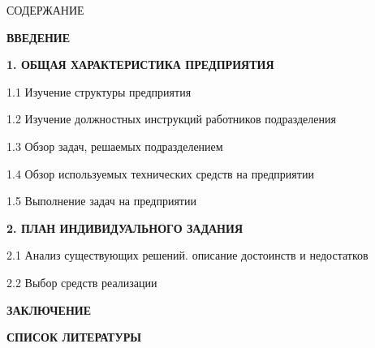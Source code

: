 {\gostTitleFont
	\redline
	СОДЕРЖАНИЕ
} 

\titlespace

{\gostFont
	\par
	\par {\bfseries ВВЕДЕНИЕ }
	\par {\bfseries 1. ОБЩАЯ ХАРАКТЕРИСТИКА ПРЕДПРИЯТИЯ }
	\par 1.1 Изучение структуры предприятия 
	\par 1.2 Изучение должностных инструкций работников подразделения 
	\par 1.3 Обзор задач, решаемых подразделением 
	\par 1.4 Обзор используемых технических средств на предприятии 
	\par 1.5 Выполнение задач на предприятии 
	\par {\bfseries 2. ПЛАН ИНДИВИДУАЛЬНОГО ЗАДАНИЯ }
	\par 2.1 Анализ существующих решений. описание достоинств и недостатков  
	\par 2.2 Выбор средств реализации  
	\par {\bfseries ЗАКЛЮЧЕНИЕ } 
	\par {\bfseries СПИСОК ЛИТЕРАТУРЫ } 
	\par 
}
